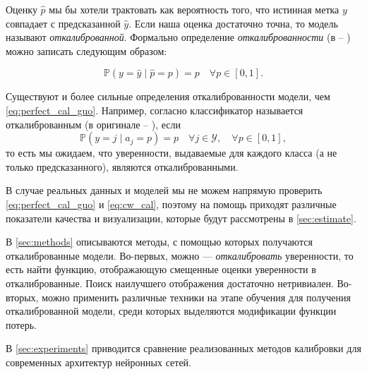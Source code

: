 \documentclass[12pt]{article}
\begin{document}
Оценку $\hat{p}$ мы бы хотели трактовать как вероятность того, что истинная метка $y$ совпадает с предсказанной $\hat{y}$. Если наша оценка достаточно точна, то модель называют \emph{откалиброванной}. Формально определение \emph{откалиброванности} (в \cite{on_cal} -- ) можно записать следующим образом:

\begin{equation}\label{eq:perfect_cal_guo}
    \mathbb{P}\left(y=\hat{y}\mid \hat{p}=p\right)=p \quad \forall p\in\left[0, 1\right].
\end{equation}

Существуют и более сильные определения откалиброванности модели, чем \eqref{eq:perfect_cal_guo}. Например, согласно \cite{isotonic} классификатор называется откалиброванным (в оригинале -- ), если 
\begin{equation}\label{eq:cw_cal}
    \mathbb{P}(y=j\mid a_j=p) = p \quad \forall j\in\mathcal{Y}, \quad \forall p\in \left[0, 1\right],
\end{equation}
то есть мы ожидаем, что уверенности, выдаваемые для каждого класса (а не только предсказанного), являются откалиброванными. 

В случае реальных данных и моделей мы не можем напрямую проверить \eqref{eq:perfect_cal_guo} и \eqref{eq:cw_cal}, поэтому на помощь приходят различные показатели качества и визуализации, которые будут рассмотрены в \autoref{sec:estimate}.

В \autoref{sec:methods} описываются методы, с помощью которых получаются откалиброванные модели. Во-первых, можно --- \emph{откалибровать} уверенности, то есть найти функцию, отображающую смещенные оценки уверенности в откалиброванные. Поиск наилучшего отображения достаточно нетривиален. Во-вторых, можно применить различные техники на этапе обучения для получения откалиброванной модели, среди которых выделяются модификации функции потерь.

В \autoref{sec:experiments} приводится сравнение реализованных методов калибровки для современных архитектур нейронных сетей.

\end{document}

